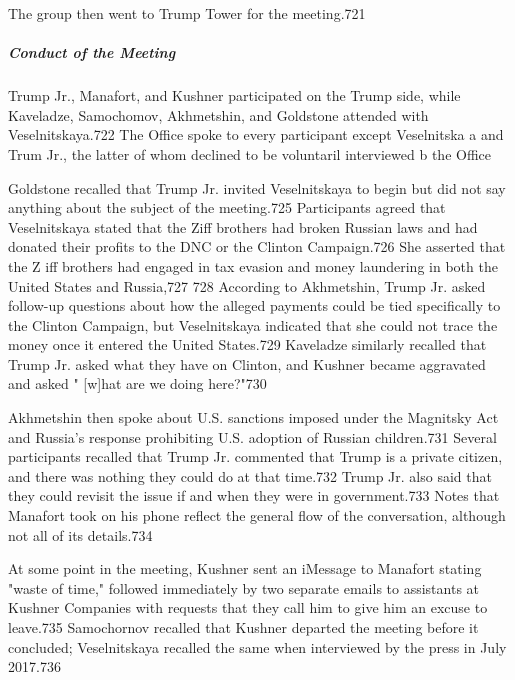The group then went to Trump Tower for the meeting.721

\subparagraph{Conduct of the Meeting}

Trump Jr., Manafort, and Kushner participated on the Trump side,  while Kaveladze, Samochomov, Akhmetshin, and Goldstone attended with Veselnitskaya.722 The Office spoke to every participant except Veselnitska a and Trum Jr., the latter of whom declined to be voluntaril interviewed b the Office

Goldstone recalled that Trump Jr. invited Veselnitskaya to begin but did not say anything about the subject of the meeting.725 Participants agreed that Veselnitskaya stated that the Ziff brothers had broken Russian laws and had donated their profits to the DNC or the Clinton Campaign.726 She asserted that the Z iff brothers had engaged in tax evasion and money laundering in both the United States and Russia,727 728 According to Akhmetshin, Trump Jr. asked follow-up questions about how the alleged payments could be tied specifically to the Clinton Campaign, but Veselnitskaya indicated that she could not trace the money once it entered the United States.729 Kaveladze similarly recalled that Trump Jr. asked what they have on Clinton, and Kushner became aggravated and asked " [w]hat are we doing here?"730

Akhmetshin then spoke about U.S. sanctions imposed under the Magnitsky Act and Russia's response prohibiting U.S. adoption of Russian children.731 Several participants recalled that Trump Jr. commented that Trump is a private citizen, and there was nothing they could do at that time.732 Trump Jr. also said that they could revisit the issue if  and when they were in government.733 Notes that Manafort took on his phone reflect the general flow of the conversation, although not all of its details.734

At some point in the meeting, Kushner sent an iMessage to Manafort stating "waste of time," followed immediately by two separate emails to assistants at Kushner Companies with requests that they call him to give him an excuse to leave.735 Samochornov recalled that Kushner departed the meeting before it  concluded; Veselnitskaya recalled the same when interviewed by the press in July 2017.736


